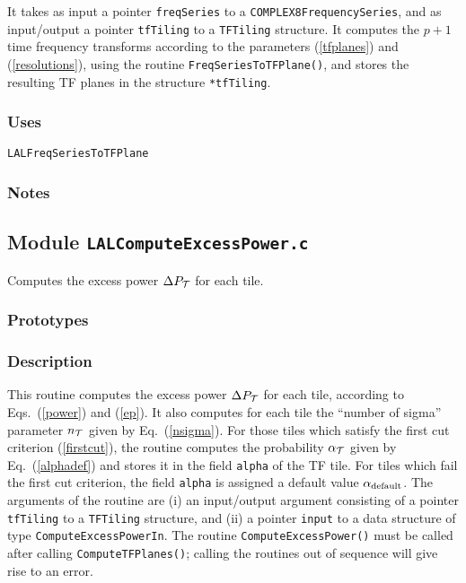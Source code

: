 It takes as input a pointer \verb+freqSeries+ to a
\verb+COMPLEX8FrequencySeries+, and as input/output a pointer \verb+tfTiling+
to a \verb+TFTiling+ structure.  It computes the $p+1$ time frequency
transforms according to the parameters (\ref{tfplanes}) and
(\ref{resolutions}), using the routine \verb+FreqSeriesToTFPlane()+, and
stores the resulting TF planes in the structure \verb+*tfTiling+.

\subsubsection*{Uses}
\begin{verbatim}
LALFreqSeriesToTFPlane
\end{verbatim}
\subsubsection*{Notes}

\vfill{\footnotesize}

\newpage
\subsection{Module \texttt{LALComputeExcessPower.c}}
\label{ss:LALComputeExcessPower.c}

Computes the excess power $\Delta P_{\cal T}$ for each tile.

\subsubsection*{Prototypes}
\vspace{0.1in}


\subsubsection*{Description}

This routine computes the excess power $\Delta
P_{\cal T}$ for each tile, according to Eqs.\ (\ref{power}) and (\ref{ep}).
It also computes for each tile the ``number of sigma'' parameter $n_{\cal T}$
given by Eq.\ (\ref{nsigma}).  For those tiles which satisfy the first cut
criterion (\ref{firstcut}), the routine computes the probability $\alpha_{\cal
T}$ given by Eq.\ (\ref{alphadef}) and stores it in the field \verb+alpha+ of
the TF tile.  For tiles which fail the first cut criterion, the field
\verb+alpha+ is assigned a default value $\alpha_{\rm default}$.  The
arguments of the routine are (i) an input/output argument consisting of a
pointer \verb+tfTiling+ to a \verb+TFTiling+ structure, and (ii) a pointer
\verb+input+ to a data structure of type \verb+ComputeExcessPowerIn+.  The
routine \verb+ComputeExcessPower()+ must be called after calling
\verb+ComputeTFPlanes()+; calling the routines out of sequence will give rise
to an error.

